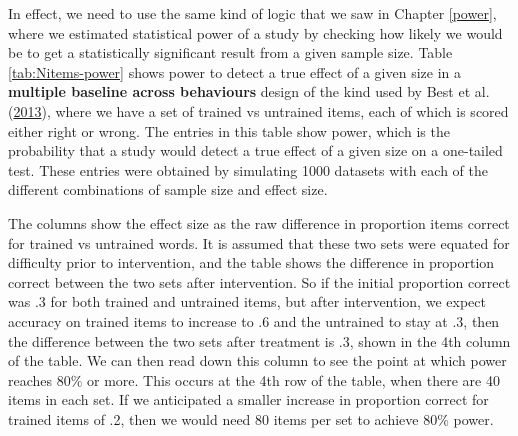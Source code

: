 \documentclass{krantz}
\begin{document}
In effect, we need to use the same kind of logic that we saw in Chapter \ref{power}, where we estimated statistical power of a study by checking how likely we would be to get a statistically significant result from a given sample size. Table \ref{tab:Nitems-power} shows power to detect a true effect of a given size in a \textbf{multiple baseline across behaviours} design of the kind used by Best et al. (\protect\hyperlink{ref-best2013}{2013}), where we have a set of trained vs untrained items, each of which is scored either right or wrong. The entries in this table show power, which is the probability that a study would detect a true effect of a given size on a one-tailed test. These entries were obtained by simulating 1000 datasets with each of the different combinations of sample size and effect size.

The columns show the effect size as the raw difference in proportion items correct for trained vs untrained words. It is assumed that these two sets were equated for difficulty prior to intervention, and the table shows the difference in proportion correct between the two sets after intervention. So if the initial proportion correct was .3 for both trained and untrained items, but after intervention, we expect accuracy on trained items to increase to .6 and the untrained to stay at .3, then the difference between the two sets after treatment is .3, shown in the 4th column of the table. We can then read down this column to see the point at which power reaches 80\% or more. This occurs at the 4th row of the table, when there are 40 items in each set. If we anticipated a smaller increase in proportion correct for trained items of .2, then we would need 80 items per set to achieve 80\% power.
\end{document}
